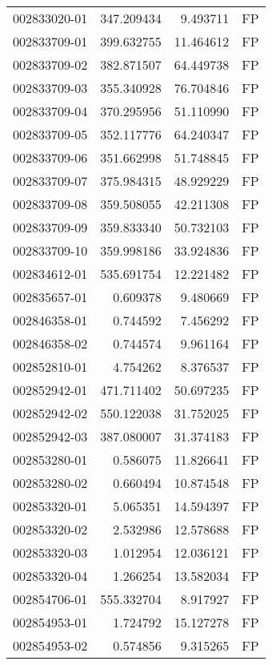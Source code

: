 \begin{tabular}{lrrl}
002833020-01 &  347.209434 &       9.493711 &   FP \\
002833709-01 &  399.632755 &      11.464612 &   FP \\
002833709-02 &  382.871507 &      64.449738 &   FP \\
002833709-03 &  355.340928 &      76.704846 &   FP \\
002833709-04 &  370.295956 &      51.110990 &   FP \\
002833709-05 &  352.117776 &      64.240347 &   FP \\
002833709-06 &  351.662998 &      51.748845 &   FP \\
002833709-07 &  375.984315 &      48.929229 &   FP \\
002833709-08 &  359.508055 &      42.211308 &   FP \\
002833709-09 &  359.833340 &      50.732103 &   FP \\
002833709-10 &  359.998186 &      33.924836 &   FP \\
002834612-01 &  535.691754 &      12.221482 &   FP \\
002835657-01 &    0.609378 &       9.480669 &   FP \\
002846358-01 &    0.744592 &       7.456292 &   FP \\
002846358-02 &    0.744574 &       9.961164 &   FP \\
002852810-01 &    4.754262 &       8.376537 &   FP \\
002852942-01 &  471.711402 &      50.697235 &   FP \\
002852942-02 &  550.122038 &      31.752025 &   FP \\
002852942-03 &  387.080007 &      31.374183 &   FP \\
002853280-01 &    0.586075 &      11.826641 &   FP \\
002853280-02 &    0.660494 &      10.874548 &   FP \\
002853320-01 &    5.065351 &      14.594397 &   FP \\
002853320-02 &    2.532986 &      12.578688 &   FP \\
002853320-03 &    1.012954 &      12.036121 &   FP \\
002853320-04 &    1.266254 &      13.582034 &   FP \\
002854706-01 &  555.332704 &       8.917927 &   FP \\
002854953-01 &    1.724792 &      15.127278 &   FP \\
002854953-02 &    0.574856 &       9.315265 &   FP \\

\end{tabular}
